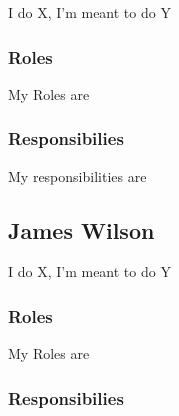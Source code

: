I do X, I'm meant to do Y



\subsubsection{Roles}

	My Roles are


\subsubsection{Responsibilies}

	My responsibilities are


\subsection{James Wilson}

I do X, I'm meant to do Y



\subsubsection{Roles}

	My Roles are


\subsubsection{Responsibilies}

